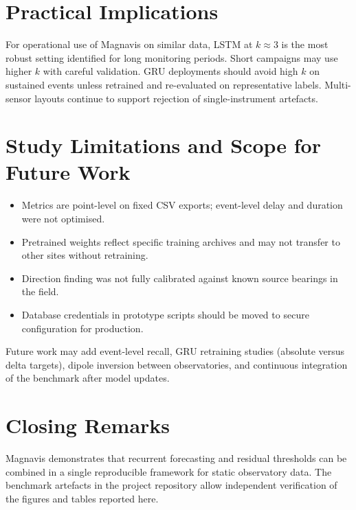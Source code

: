 \section{Practical Implications}
For operational use of Magnavis on similar data, LSTM at $k \approx 3$ is the most robust setting identified for long monitoring periods. Short campaigns may use higher $k$ with careful validation. GRU deployments should avoid high $k$ on sustained events unless retrained and re-evaluated on representative labels. Multi-sensor layouts continue to support rejection of single-instrument artefacts.

\section{Study Limitations and Scope for Future Work}
\begin{itemize}
    \item Metrics are point-level on fixed CSV exports; event-level delay and duration were not optimised.
    \item Pretrained weights reflect specific training archives and may not transfer to other sites without retraining.
    \item Direction finding was not fully calibrated against known source bearings in the field.
    \item Database credentials in prototype scripts should be moved to secure configuration for production.
\end{itemize}
Future work may add event-level recall, GRU retraining studies (absolute versus delta targets), dipole inversion between observatories, and continuous integration of the benchmark after model updates.

\section{Closing Remarks}
Magnavis demonstrates that recurrent forecasting and residual thresholds can be combined in a single reproducible framework for static observatory data. The benchmark artefacts in the project repository allow independent verification of the figures and tables reported here.

